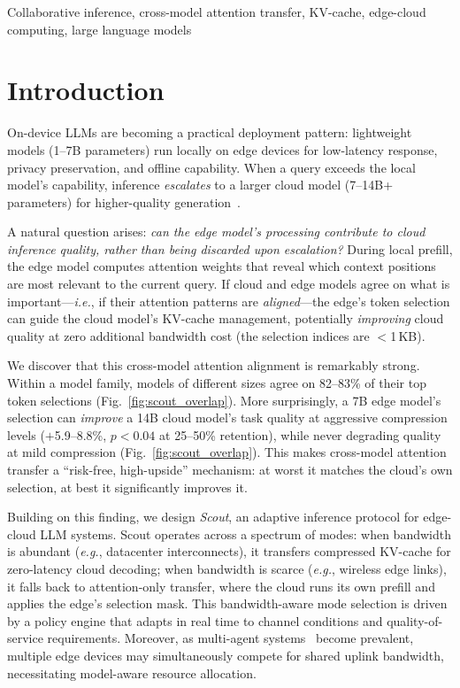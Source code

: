 \documentclass[conference]{IEEEtran}
\newcommand{\eg}{\textit{e.g.}\xspace}
\newcommand{\ie}{\textit{i.e.}\xspace}
\begin{document}
\begin{IEEEkeywords}
Collaborative inference, cross-model attention transfer, KV-cache, edge-cloud computing, large language models
\end{IEEEkeywords}

\section{Introduction}
\label{sec:intro}

On-device LLMs are becoming a practical deployment pattern: lightweight models (1--7B parameters) run locally on edge devices for low-latency response, privacy preservation, and offline capability.
When a query exceeds the local model's capability, inference \emph{escalates} to a larger cloud model (7--14B+ parameters) for higher-quality generation~\cite{splitwise,distserve}.

A natural question arises: \emph{can the edge model's processing contribute to cloud inference quality, rather than being discarded upon escalation?}
During local prefill, the edge model computes attention weights that reveal which context positions are most relevant to the current query.
If cloud and edge models agree on what is important---\ie, if their attention patterns are \emph{aligned}---the edge's token selection can guide the cloud model's KV-cache management, potentially \emph{improving} cloud quality at zero additional bandwidth cost (the selection indices are $<$1\,KB).

We discover that this cross-model attention alignment is remarkably strong.
Within a model family, models of different sizes agree on 82--83\% of their top token selections (Fig.~\ref{fig:scout_overlap}).
More surprisingly, a 7B edge model's selection can \emph{improve} a 14B cloud model's task quality at aggressive compression levels ($+$5.9--8.8\%, $p < 0.04$ at 25--50\% retention), while never degrading quality at mild compression (Fig.~\ref{fig:scout_overlap}).
This makes cross-model attention transfer a ``risk-free, high-upside'' mechanism: at worst it matches the cloud's own selection, at best it significantly improves it.

Building on this finding, we design \emph{Scout}, an adaptive inference protocol for edge-cloud LLM systems.
Scout operates across a spectrum of modes: when bandwidth is abundant (\eg, datacenter interconnects), it transfers compressed KV-cache for zero-latency cloud decoding; when bandwidth is scarce (\eg, wireless edge links), it falls back to attention-only transfer, where the cloud runs its own prefill and applies the edge's selection mask.
This bandwidth-aware mode selection is driven by a policy engine that adapts in real time to channel conditions and quality-of-service requirements.
Moreover, as multi-agent systems~\cite{ioa} become prevalent, multiple edge devices may simultaneously compete for shared uplink bandwidth, necessitating model-aware resource allocation.
\end{document}

